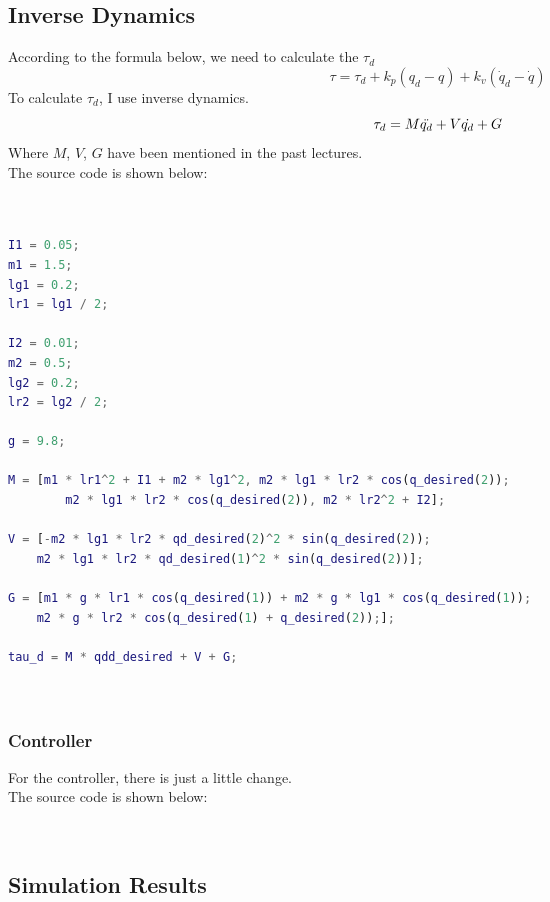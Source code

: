 \documentclass{article}
\begin{document}
\subsection*{Inverse Dynamics}
According to the formula below, we need to calculate the $\tau_d$\\
    \begin{equation}
        \tau=\tau_d+k_p(q_d-q)+k_v(\dot{q}_d-\dot{q})
    \end{equation}
To calculate $\tau_d$, I use inverse dynamics.\\ 
\begin{equation}
    \tau_d = M \Ddot{q_d} + V \dot{q_d} + G
\end{equation}
Where $M$, $V$, $G$ have been mentioned in the past lectures.\\
The source code is shown below:
\begin{lstlisting}[language=Matlab, basicstyle=\small\ttfamily]


I1 = 0.05;
m1 = 1.5;
lg1 = 0.2;
lr1 = lg1 / 2;

I2 = 0.01;
m2 = 0.5;
lg2 = 0.2;
lr2 = lg2 / 2;

g = 9.8;

M = [m1 * lr1^2 + I1 + m2 * lg1^2, m2 * lg1 * lr2 * cos(q_desired(2));
        m2 * lg1 * lr2 * cos(q_desired(2)), m2 * lr2^2 + I2];

V = [-m2 * lg1 * lr2 * qd_desired(2)^2 * sin(q_desired(2));
    m2 * lg1 * lr2 * qd_desired(1)^2 * sin(q_desired(2))];

G = [m1 * g * lr1 * cos(q_desired(1)) + m2 * g * lg1 * cos(q_desired(1));
    m2 * g * lr2 * cos(q_desired(1) + q_desired(2));];

tau_d = M * qdd_desired + V + G;

    
\end{lstlisting}

\subsubsection*{Controller}
For the controller, there is just a little change.\\

The source code is shown below:\\

\begin{lstlisting}[language=Matlab, basicstyle=\small\ttfamily]
    
\end{lstlisting}

\subsection{Simulation Results}
\end{document}
